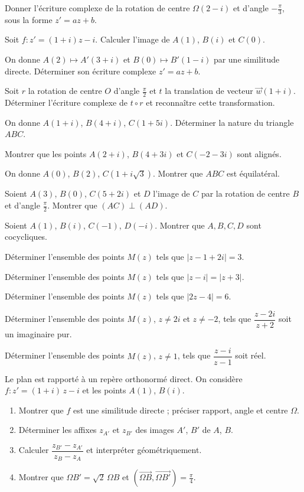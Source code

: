 \exo{} Donner l'écriture complexe de la rotation de centre $\Omega(2-i)$ et d'angle
$-\frac\pi3$, sous la forme $z'=az+b$.

\exo{} Soit $f:z'=(1+i)z-i$. Calculer l'image de $A(1)$, $B(i)$ et $C(0)$.

\exo{} On donne $A(2)\mapsto A'(3+i)$ et $B(0)\mapsto B'(1-i)$ par une similitude directe.
Déterminer son écriture complexe $z'=az+b$.

\exo{} Soit $r$ la rotation de centre $O$ d'angle $\frac\pi2$ et $t$ la translation de
vecteur $\vec w(1+i)$. Déterminer l'écriture complexe de $t\circ r$ et reconnaître cette transformation.

\exo{} On donne $A(1+i)$, $B(4+i)$, $C(1+5i)$. Déterminer la nature du triangle $ABC$.

\exo{} Montrer que les points $A(2+i)$, $B(4+3i)$ et $C(-2-3i)$ sont alignés.

\exo{} On donne $A(0)$, $B(2)$, $C(1+i\sqrt3)$. Montrer que $ABC$ est équilatéral.

\exo{} Soient $A(3)$, $B(0)$, $C(5+2i)$ et $D$ l'image de $C$ par la rotation de centre $B$
et d'angle $\frac\pi2$. Montrer que $(AC)\perp(AD)$.

\exo{} Soient $A(1)$, $B(i)$, $C(-1)$, $D(-i)$. Montrer que $A,B,C,D$ sont cocycliques.

\exo{} Déterminer l'ensemble des points $M(z)$ tels que $|z-1+2i|=3$.

\exo{} Déterminer l'ensemble des points $M(z)$ tels que $|z-i|=|z+3|$.

\exo{} Déterminer l'ensemble des points $M(z)$ tels que $|2z-4|=6$.

\exo{} Déterminer l'ensemble des points $M(z)$, $z\neq 2i$ et $z\neq -2$, tels que
$\dfrac{z-2i}{z+2}$ soit un imaginaire pur.

\exo{} Déterminer l'ensemble des points $M(z)$, $z\neq1$, tels que $\dfrac{z-i}{z-1}$ soit réel.

\exo{} Le plan est rapporté à un repère orthonormé direct. On considère $f:z'=(1+i)\,z-i$
et les points $A(1)$, $B(i)$.
\begin{enumerate}[label=\arabic*)]
\item Montrer que $f$ est une similitude directe ; préciser rapport, angle et centre $\Omega$.
\item Déterminer les affixes $z_{A'}$ et $z_{B'}$ des images $A'$, $B'$ de $A$, $B$.
\item Calculer $\dfrac{z_{B'}-z_{A'}}{z_B-z_A}$ et interpréter géométriquement.
\item Montrer que $\Omega B'=\sqrt2\,\Omega B$ et $(\overrightarrow{\Omega B},\overrightarrow{\Omega B'})=\frac\pi4$.
\end{enumerate}

